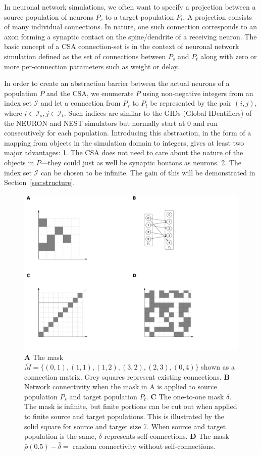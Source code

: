 \documentclass{frontiersSCNS} %
\newcommand{\INLINEFIGS}{} %
\begin{document}
In neuronal network simulations, we often want to specify a projection
between a source population of neurons $P_s$ to a target population
$P_t$.  A projection consists of many individual connections.  In
nature, one such connection corresponds to an axon forming a synaptic
contact on the spine/dendrite of a receiving neuron.  The basic
concept of a CSA connection-set is in the context of neuronal network
simulation defined as the set of connections between $P_s$ and $P_t$
along with zero or more per-connection parameters such as weight or
delay.

In order to create an abstraction barrier between the actual neurons
of a population $P$ and the CSA, we enumerate $P$ using non-negative
integers from an index set $\mathcal{I}$ and let a connection from
$P_s$ to $P_t$ be represented by the pair $(i, j)$, where $i \in
\mathcal{I}_s, j \in \mathcal{I}_t$.  Such indices are similar to
the GIDs (Global IDentifiers) of the NEURON and NEST simulators but
normally start at 0 and run consecutively for each population.
Introducing this abstraction, in the form of a mapping from objects in
the simulation domain to integers, gives at least two major
advantages: 1. The CSA does not need to care about the nature of the
objects in $P$---they could just as well be synaptic boutons as neurons.
2. The index set $\mathcal{I}$ can be chosen to be infinite.  The
gain of this will be demonstrated in Section~\ref{sec:structure}.

\ifdefined\INLINEFIGS
\begin{figure}[ht]
\centering
\includegraphics[scale=.7]{figures/csa-pane.pdf}
\caption{
  \textbf{A} The mask $\overline{M} =
  \{(0,1), (1,1), (1,2), (3,2), (2,3), (0,4)\}$ shown as a connection
  matrix. Grey squares represent existing connections.
  \textbf{B} Network connectivity when the mask in A is applied to
  source population $P_s$ and target population
  $P_t$.
  \textbf{C} The one-to-one mask $\bar{\delta}$. The mask is infinite,
  but finite portions can be cut out when applied to finite source and
  target populations. This is illustrated by the solid square for
  source and target size 7. When source and target population is the
  same, $\bar{\delta}$ represents self-connections.
  \textbf{D} The mask $\bar{\rho}(0.5) - \bar{\delta} =$ random
  connectivity without self-connections.
}\label{fig:csa} 
\end{figure}
\fi
\end{document}
